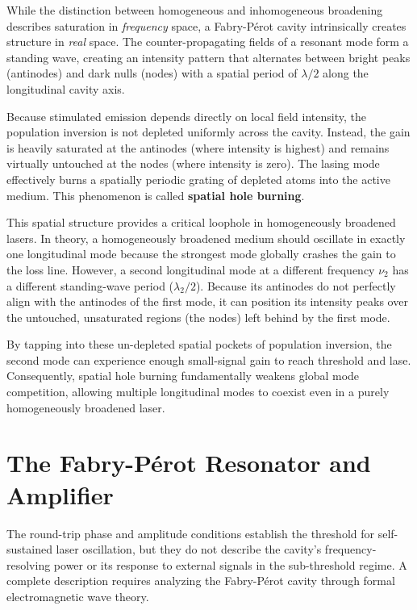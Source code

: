 While the distinction between homogeneous and inhomogeneous broadening describes saturation in \emph{frequency} space, a Fabry-P\'{e}rot cavity intrinsically creates structure in \emph{real} space. The counter-propagating fields of a resonant mode form a standing wave, creating an intensity pattern that alternates between bright peaks (antinodes) and dark nulls (nodes) with a spatial period of $\lambda/2$ along the longitudinal cavity axis.

Because stimulated emission depends directly on local field intensity, the population inversion is not depleted uniformly across the cavity. Instead, the gain is heavily saturated at the antinodes (where intensity is highest) and remains virtually untouched at the nodes (where intensity is zero). The lasing mode effectively burns a spatially periodic grating of depleted atoms into the active medium. This phenomenon is called \textbf{spatial hole burning}.

This spatial structure provides a critical loophole in homogeneously broadened lasers. In theory, a homogeneously broadened medium should oscillate in exactly one longitudinal mode because the strongest mode globally crashes the gain to the loss line. However, a second longitudinal mode at a different frequency $\nu_2$ has a different standing-wave period ($\lambda_2/2$). Because its antinodes do not perfectly align with the antinodes of the first mode, it can position its intensity peaks over the untouched, unsaturated regions (the nodes) left behind by the first mode.

By tapping into these un-depleted spatial pockets of population inversion, the second mode can experience enough small-signal gain to reach threshold and lase. Consequently, spatial hole burning fundamentally weakens global mode competition, allowing multiple longitudinal modes to coexist even in a purely homogeneously broadened laser.

\section{The Fabry-P\'{e}rot Resonator and Amplifier}

The round-trip phase and amplitude conditions establish the threshold for self-sustained laser oscillation, but they do not describe the cavity's frequency-resolving power or its response to external signals in the sub-threshold regime. A complete description requires analyzing the Fabry-P\'{e}rot cavity through formal electromagnetic wave theory.

